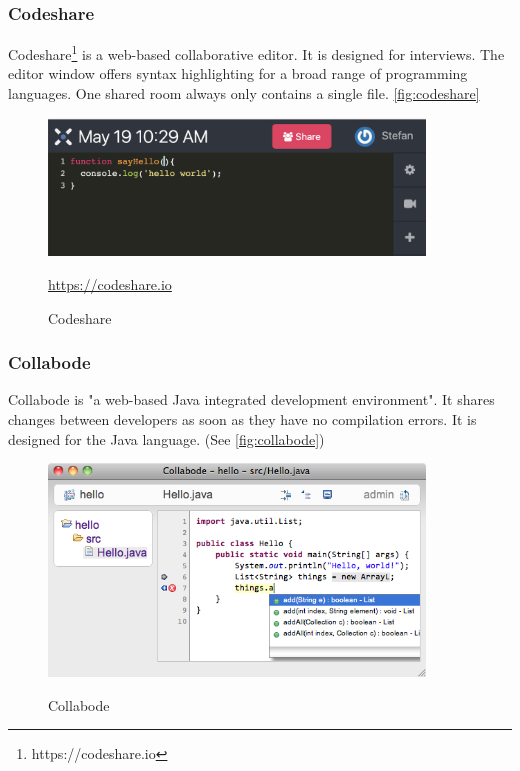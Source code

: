 \subsubsection{Codeshare}
Codeshare\footnote{https://codeshare.io} is a web-based collaborative editor. It is designed for interviews. The editor window offers syntax highlighting for a broad range of programming languages. One shared room always only contains a single file. \autoref{fig:codeshare}
\begin{figure}[h]
    \centering
    \includegraphics[width=100mm]{figures/screenshots/codeshare.png}
	\caption{Codeshare}
	\href{https://codeshare.io}{https://codeshare.io}
    \label{fig:codeshare}
\end{figure}
\subsubsection{Collabode}
Collabode \cite{Goldman:2011:RCC:2047196.2047215} is "a web-based Java integrated development environment". It shares changes between developers as soon as they have no compilation errors. It is designed for the Java language. (See \autoref{fig:collabode})
\begin{figure}[h]
    \centering
    \includegraphics[width=100mm]{figures/screenshots/collabode.jpg}
	\caption{Collabode}
	\cite{Goldman:2011:RCC:2047196.2047215}
    \label{fig:collabode}
\end{figure}
